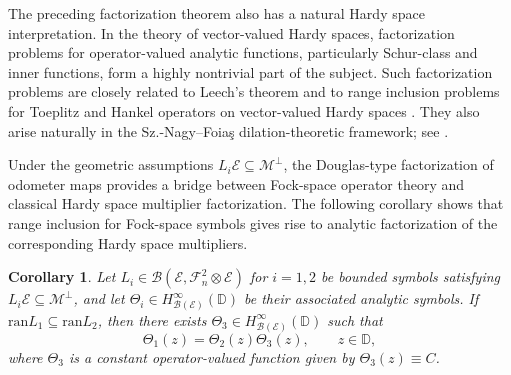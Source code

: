 \documentclass[12pt]{amsart}
\newtheorem{corollary}[theorem]{Corollary}
\theoremstyle{definition}
\theoremstyle{remark}
\def \D{\mathbb{D}}
\newcommand{\clb}{\mathcal{B}}
\newcommand{\cle}{\mathcal{E}}
\newcommand{\clm}{\mathcal{M}}
\newcommand{\clf}{\mathcal{F}}
\newcommand{\ran}{\mathrm{ran}}
\numberwithin{equation}{section}
\begin{document}
The preceding factorization theorem also has a natural Hardy space
interpretation. In the theory of vector-valued Hardy spaces, factorization problems for operator-valued analytic functions, particularly Schur-class and inner
functions, form a highly nontrivial part of the subject. Such factorization problems are closely related to Leech's theorem
\cite{Leech2014} and to range inclusion problems for Toeplitz and Hankel operators on vector-valued Hardy spaces \cite{Bhuia}. They also arise naturally in the Sz.-Nagy--Foiaş dilation-theoretic framework; see \cite[Chapter~5]{SzNagyFoias}.

Under the geometric assumptions \(L_i\cle\subseteq\clm^\perp\), the
Douglas-type factorization of odometer maps provides a bridge between
Fock-space operator theory and classical Hardy space multiplier factorization.
The following corollary shows that range inclusion for Fock-space symbols
gives rise to analytic factorization of the corresponding Hardy space
multipliers.

\begin{corollary}\label{cor:douglas_toeplitz_factorization}
Let $L_i \in \clb(\cle, \clf_n^2 \otimes \cle)$ for $i=1,2$ be bounded symbols satisfying $L_i\cle \subseteq \clm^{\perp}$, and let $\Theta_i \in H^\infty_{\clb(\cle)}(\D)$ be their associated analytic symbols. 
If $\ran L_1 \subseteq \ran L_2$, then there exists $\Theta_3 \in H^\infty_{\clb(\cle)}(\D)$ such that
\[
\Theta_1(z) = \Theta_2(z) \Theta_3 (z), \qquad z \in \D, 
\]
where $\Theta_3$ is a constant operator-valued function given by $\Theta_3(z) \equiv C$.
\end{corollary}
\end{document}
